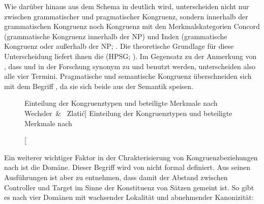 Wie darüber hinaus aus dem Schema in  deutlich wird,
unterscheiden \citet{wechslerzlatic2003} nicht nur zwischen grammatischer und
pragmatischer Kongruenz, sondern innerhalb der grammatischen Kongruenz noch
Kongruenz mit den Merkmalskategorien Concord (grammatische Kongruenz
 innerhalb der NP) und Index (grammatische Kongruenz
 oder  außerhalb der NP;
\cite[8--17]{wechslerzlatic2003}. Die theoretische Grundlage für diese
Unterscheidung liefert ihnen die 
(HPSG; \cite{pollardsag1994}). Im Gegensatz zu der Anmerkung von
\citet[164]{fleischer2012}, dass  und  in der Forschung
synonym zu  und  benutzt werden, unterscheiden
\citet{wechslerzlatic2003} also alle vier Termini. Pragmatische und semantische
Kongruenz überschneiden sich mit dem Begriff , da sie
sich beide aus der Semantik speisen.

\begin{figure}
\centering
{}
\caption%
	[Einteilung der Kongruenztypen und beteiligte Merkmale nach Wechsler~\&~%
	Zlatić]%
	{Einteilung der Kongruenztypen und beteiligte Merkmale nach
	\citet{wechslerzlatic2003}}
\label{fig:termini}
\end{figure}

\label{phsec:domain}
Ein weiterer wichtiger Faktor in der Chrakterisierung von Kongruenzbeziehungen
nach \citet{corbett2006} ist die Domäne. Dieser Begriff wird von
\citet{corbett2006} nicht formal definiert. Aus seinen Ausführungen ist aber zu
entnehmen, dass damit der Abstand zwischen Controller und Target im Sinne der
Konstituenz von Sätzen gemeint ist. So gibt es nach \citet[54]{corbett2006}
vier Domänen mit wachsender Lokalität und abnehmender Kanonizität:

